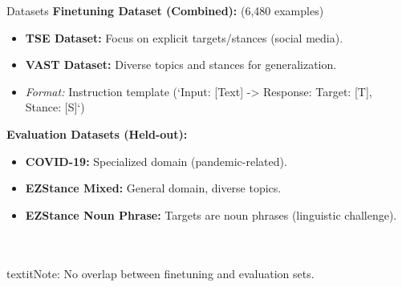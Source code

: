 \documentclass{beamer}
\begin{document}
\begin{frame}{Datasets}
  \textbf{Finetuning Dataset (Combined):} (6,480 examples)
  \begin{itemize}
    \item \textbf{TSE Dataset:} Focus on explicit targets/stances (social media).
    \item \textbf{VAST Dataset:} Diverse topics and stances for generalization.
    \item \textit{Format:} Instruction template (`Input: [Text] -> Response: Target: [T], Stance: [S]`)
  \end{itemize}

  \medskip %

  \textbf{Evaluation Datasets (Held-out):}
  \begin{itemize}
    \item \textbf{COVID-19:} Specialized domain (pandemic-related).
    \item \textbf{EZStance Mixed:} General domain, diverse topics.
    \item \textbf{EZStance Noun Phrase:} Targets are noun phrases (linguistic challenge).
  \end{itemize}
  \\\\textit{Note: No overlap between finetuning and evaluation sets.}
\end{frame}
\end{document}
